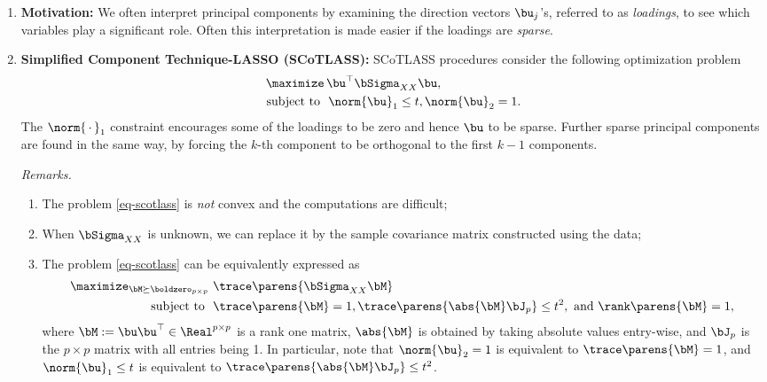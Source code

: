 \documentclass[12pt]{article}
\begin{document}
\begin{enumerate}[label=\textbf{\arabic*.}]

	\item \textbf{Motivation:} We often interpret principal components by examining the direction vectors $\bu_j$'s, referred to as \emph{loadings}, to see which variables play a significant role. Often this interpretation is made easier if the loadings are \emph{sparse}. 
	
	\item \textbf{Simplified Component Technique-LASSO (SCoTLASS):} SCoTLASS procedures consider the following optimization problem 
	\begin{equation}\label{eq-scotlass}
		\begin{aligned}
			\maximize & \, \bu^\top \bSigma_{XX} \bu, \\ 
			\text{ subject to } & \ \norm{\bu}_1 \le t, \norm{\bu}_2 = 1. 
		\end{aligned}
	\end{equation}
	The $\norm{\,\cdot\,}_1$ constraint encourages some of the loadings to be zero and hence $\bu$ to be sparse. Further sparse principal components are found in the same way, by forcing the $k$-th component to be orthogonal to the first $k - 1$ components. 
	
	\textit{Remarks.} 
	\begin{enumerate}
		\item The problem \eqref{eq-scotlass} is \emph{not} convex and the computations are difficult; 
		\item When $\bSigma_{XX}$ is unknown, we can replace it by the sample covariance matrix constructed using the data; 
		\item The problem \eqref{eq-scotlass} can be equivalently expressed as 
		\begin{equation}\label{eq-scotlass-1}
			\begin{aligned}
				\maximize_{\bM \succeq \boldzero_{p \times p}} & \ \trace \parens{\bSigma_{XX} \bM} \\ 
				\text{ subject to } & \ \trace \parens{\bM} = 1, \trace \parens{\abs{\bM} \bJ_p} \le t^2, \text{ and } \rank \parens{\bM} = 1, 
			\end{aligned}
		\end{equation}
		where $\bM := \bu \bu^\top \in \Real^{p \times p}$ is a rank one matrix, $\abs{\bM}$ is obtained by taking absolute values entry-wise, and $\bJ_p$ is the $p \times p$ matrix with all entries being 1. In particular, note that $\norm{\bu}_2 = 1$ is equivalent to $\trace \parens{\bM} = 1$, and $\norm{\bu}_1 \le t$ is equivalent to $\trace \parens{\abs{\bM} \bJ_p} \le t^2$. 
				

\end{enumerate}
\end{enumerate}
\end{document}

